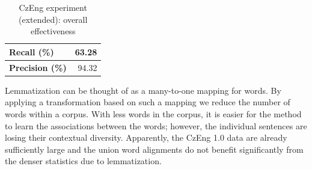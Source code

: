 \begin{table}[!htb]
	\centering
	\caption{CzEng experiment (extended): overall effectiveness}
	\label{table:czeng_extended_overall}
	\vspace{1em}
	\begin{tabular}{|l|r|}
		\hline
		\textbf{Recall (\%)} & 63.28 \\
		\hline
		\textbf{Precision (\%)} & 94.32 \\
		\hline
	\end{tabular}
\end{table}

Lemmatization can be thought of as a many-to-one mapping for words. By applying a transformation based on such a mapping we reduce the number of words within a corpus. With less words in the corpus, it is easier for the method to learn the associations between the words; however, the individual sentences are losing their contextual diversity. Apparently, the CzEng 1.0 data are already sufficiently large and the union word alignments do not benefit significantly from the denser statistics due to lemmatization.
